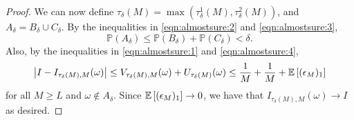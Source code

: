 \begin{proof}
        We can now define $\tau_\delta(M) = \max(\tau^1_\delta(M), \tau^2_\delta(M))$, and 
        $A_\delta = B_\delta \cup C_\delta$. By the inequalities in \eqref{eqn:almostsure:2}
        and \eqref{eqn:almostsure:3},
        \[ 
                \mathbb{P}(A_\delta) \leq \mathbb{P}(B_\delta) + \mathbb{P}(C_\delta) < \delta.  
        \] 
        Also, by the inequalities in \eqref{eqn:almostsure:1} and \eqref{eqn:almostsure:4},
	\[ 
                \left|I - I_{\tau_\delta(M),M}(\omega)\right| 
                \leq
                V_{\tau_\delta(M),M}(\omega) 
                +
                U_{\tau_\delta(M)}(\omega) 
                \leq 
                \frac{1}{M} + \frac{1}{M} + \mathbb{E}\left[(\epsilon_M)_1\right]
	\]
        for all $M \geq L$ and $\omega \notin A_\delta$. Since $\mathbb{E}\left[(\epsilon_M)_1\right] \to 0$, we have that 
        $I_{\tau_\delta(M),M}(\omega) \to I$ as desired.
\end{proof}
